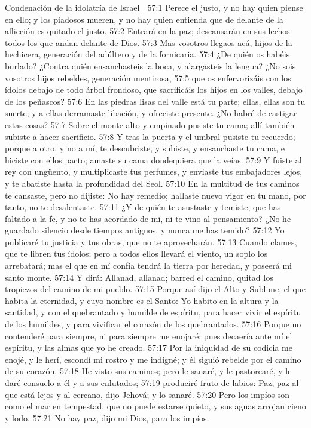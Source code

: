 Condenación de la idolatría de Israel  

57:1 Perece el justo, y no hay quien piense en ello; y los piadosos mueren, y no hay quien entienda que de delante de la aflicción es quitado el justo.  
57:2 Entrará en la paz; descansarán en sus lechos todos los que andan delante de Dios.  
57:3 Mas vosotros llegaos acá, hijos de la hechicera, generación del adúltero y de la fornicaria.  
57:4 ¿De quién os habéis burlado? ¿Contra quién ensanchasteis la boca, y alargasteis la lengua? ¿No sois vosotros hijos rebeldes, generación mentirosa,  
57:5 que os enfervorizáis con los ídolos debajo de todo árbol frondoso, que sacrificáis los hijos en los valles, debajo de los peñascos?  
57:6 En las piedras lisas del valle está tu parte; ellas, ellas son tu suerte; y a ellas derramaste libación, y ofreciste presente. ¿No habré de castigar estas cosas?  
57:7 Sobre el monte alto y empinado pusiste tu cama; allí también subiste a hacer sacrificio.  
57:8 Y tras la puerta y el umbral pusiste tu recuerdo; porque a otro, y no a mí, te descubriste, y subiste, y ensanchaste tu cama, e hiciste con ellos pacto; amaste su cama dondequiera que la veías.  
57:9 Y fuiste al rey con ungüento, y multiplicaste tus perfumes, y enviaste tus embajadores lejos, y te abatiste hasta la profundidad del Seol.  
57:10 En la multitud de tus caminos te cansaste, pero no dijiste: No hay remedio; hallaste nuevo vigor en tu mano, por tanto, no te desalentaste.  
57:11 ¿Y de quién te asustaste y temiste, que has faltado a la fe, y no te has acordado de mí, ni te vino al pensamiento? ¿No he guardado silencio desde tiempos antiguos, y nunca me has temido?  
57:12 Yo publicaré tu justicia y tus obras, que no te aprovecharán.  
57:13 Cuando clames, que te libren tus ídolos; pero a todos ellos llevará el viento, un soplo los arrebatará; mas el que en mí confía tendrá la tierra por heredad, y poseerá mi santo monte.  
57:14 Y dirá: Allanad, allanad; barred el camino, quitad los tropiezos del camino de mi pueblo.  
57:15 Porque así dijo el Alto y Sublime, el que habita la eternidad, y cuyo nombre es el Santo: Yo habito en la altura y la santidad, y con el quebrantado y humilde de espíritu, para hacer vivir el espíritu de los humildes, y para vivificar el corazón de los quebrantados.  
57:16 Porque no contenderé para siempre, ni para siempre me enojaré; pues decaería ante mí el espíritu, y las almas que yo he creado.  
57:17 Por la iniquidad de su codicia me enojé, y le herí, escondí mi rostro y me indigné; y él siguió rebelde por el camino de su corazón.  
57:18 He visto sus caminos; pero le sanaré, y le pastorearé, y le daré consuelo a él y a sus enlutados;  
57:19 produciré fruto de labios: Paz, paz al que está lejos y al cercano, dijo Jehová; y lo sanaré.  
57:20 Pero los impíos son como el mar en tempestad, que no puede estarse quieto, y sus aguas arrojan cieno y lodo.  
57:21 No hay paz, dijo mi Dios, para los impíos. 

